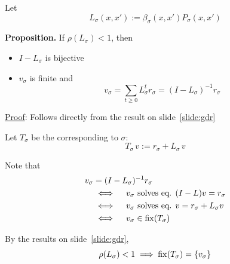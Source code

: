 \documentclass[xcolor=tex,dvipsnames]{beamer}
\begin{document}
\begin{frame}
    
    Let 
    \begin{equation*}
        L_\sigma(x,x') := \beta_\sigma(x, x') P_\sigma(x, x')
    \end{equation*}

            \vspace{0.4em}
            \vspace{0.4em}

    \begin{block}{\vspace*{-3ex}}
        {\bf Proposition.} If $\rho(L_\sigma) < 1$, then 
            \vspace{0.4em}
        \begin{itemize}
            \item $I - L_\sigma$ is bijective
            \vspace{0.4em}
            \item $v_\sigma$ is finite and 
                $$
                v_\sigma = \sum_{t \geq 0} L_\sigma^t r_\sigma = (I - L_\sigma)^{-1} r_\sigma
                $$
        \end{itemize}
    \end{block}

            \vspace{0.4em}
            \vspace{0.4em}
            \vspace{0.4em}
    \underline{Proof}: Follows directly from the result on slide~\ref{slide:gdr}

\end{frame}


\begin{frame}

    Let $T_\sigma$ be the  corresponding to $\sigma$:
    \begin{equation*}
        T_\sigma \, v := r_\sigma + L_\sigma \, v
    \end{equation*}


    Note that 
    \begin{align*}
        v_\sigma 
        & = (I - L_\sigma)^{-1} r_\sigma
        \\
        & \iff \quad
            v_\sigma \text{ solves eq. } (I - L) v =  r_\sigma 
            \\
        & \iff \quad
            v_\sigma \text{ solves eq. } v =  r_\sigma + L_\sigma v
            \\
        & \iff \quad
            v_\sigma \in \operatorname{fix}(T_\sigma)
    \end{align*}

    \vspace{0.4em}
    
    By the results on slide~\ref{slide:gdr},
    \begin{equation*}
        \rho(L_\sigma) < 1
        \implies 
        \operatorname{fix}(T_\sigma) = \{v_\sigma\}
    \end{equation*}


\end{frame}
\end{document}
